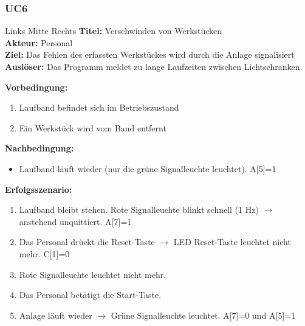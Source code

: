 \documentclass[oneside,a4paper,titlepage]{scrartcl} %
\begin{document}
\subsubsection{UC6}
\begin{tabbing}
 Links \= Mitte \= Rechts \kill
 \textbf{Titel:} \> \> Verschwinden von Werkstücken\\
 \textbf{Akteur:} \> \> Personal\\
 \textbf{Ziel:} \> \> Das Fehlen des erfassten Werkstückes wird durch die Anlage signalisiert\\
 \textbf{Auslöser:} \> \> Das Programm meldet zu lange Laufzeiten zwischen Lichtschranken\\
\end{tabbing}
\textbf{Vorbedingung:}
\begin{enumerate}
 \item Laufband befindet sich im Betriebszustand
 \item Ein Werkstück wird vom Band entfernt
\end{enumerate}
\textbf{Nachbedingung:}
\begin{itemize}
 \item Laufband läuft wieder (nur die grüne Signalleuchte leuchtet). A[5]=1
\end{itemize}
\textbf{Erfolgsszenario:}
\begin{enumerate}
 \item Laufband bleibt stehen. Rote Signalleuchte blinkt schnell (1 Hz) $\rightarrow$ anstehend unquittiert. A[7]=1
 \item Das Personal drückt die Reset-Taste $\rightarrow$ LED Reset-Taste leuchtet nicht mehr. C[1]=0
 \item Rote Signalleuchte leuchtet nicht mehr.
 \item Das Personal betätigt die Start-Taste.
 \item Anlage läuft wieder $\rightarrow$ Grüne Signalleuchte leuchtet. A[7]=0 und A[5]=1
\end{enumerate}

\newpage
\end{document}
